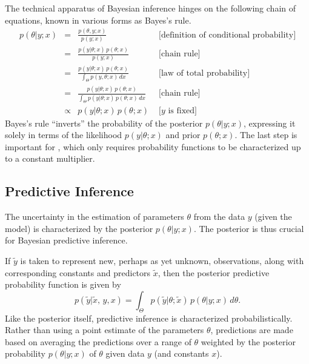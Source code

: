 The technical apparatus of Bayesian inference hinges on the following
chain of equations, known in various forms as Bayes's rule.
%
\[
\begin{array}{rcll}
p(\theta|y;x)  & =  & \displaystyle \frac{p(\theta,y;x)}{p(y;x)} 
& \mbox{{} \ \ \ \ \ [definition of  conditional probability]}
\\[16pt]
& = & \displaystyle \frac{p(y|\theta;x) \, p(\theta;x)}{p(y;x)}
& \mbox{{} \ \ \ \ \ [chain rule]}
\\[16pt]
& = & \displaystyle \frac{p(y|\theta;x) \, p(\theta;x)}
                        {\int_{\Theta} p(y,\theta;x) \, dx}
& \mbox{{} \ \ \ \ \ [law of total probability]}
\\[16pt]
& = & \displaystyle \frac{p(y|\theta;x) \, p(\theta;x)}
                        {\int_{\Theta} p(y|\theta;x) \, p(\theta;x) \, dx}
& \mbox{{} \ \ \ \ \ [chain rule]}
\\[16pt]
& \propto & \displaystyle p(y|\theta;x) \, p(\theta;x)
& \mbox{{} \ \ \ \ \ [$y$ is fixed]}
\end{array}
\]
%
Bayes's rule ``inverts'' the probability of the posterior
$p(\theta|y;x)$, expressing it solely in terms of the likelihood
$p(y|\theta;x)$ and prior $p(\theta;x)$.  The last step is important
for \Stan, which only requires probability functions to be
characterized up to a constant multiplier.  

\subsection{Predictive Inference}

The uncertainty in the estimation of parameters $\theta$ from the data
$y$ (given the model) is characterized by the posterior
$p(\theta|y;x)$.  The posterior is thus crucial for Bayesian
predictive inference.

If $\tilde{y}$ is taken to represent new, perhaps as yet unknown,
observations, along with corresponding constants and predictors
$\tilde{x}$, then the posterior predictive probability function is
given by
%
\[
p(\tilde{y}|\tilde{x},\, y,x)
= \int_{\Theta} p(\tilde{y}|\theta;\tilde{x}) 
                \, p(\theta|y;x) \, d\theta.
\]
Like the posterior itself, predictive inference is characterized
probabilistically.  Rather than using a point estimate of the
parameters $\theta$, predictions are made based on averaging the
predictions over a range of $\theta$ weighted by the posterior
probability $p(\theta|y;x)$ of $\theta$ given data $y$ (and constants
$x$).

